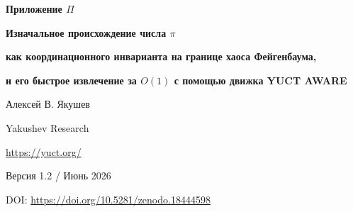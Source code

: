 \documentclass[12pt,a4paper]{article}
\newcommand{\Sodd}{S_{\mathrm{odd}}}
\newcommand{\Seven}{S_{\mathrm{even}}}
\newcommand{\df}{d_{\!f}}  %
\begin{document}
	
	\begin{titlepage}
		\centering
		\vspace*{0cm}
		
		{\Huge\bfseries Приложение $\Pi$\par}
		\vspace{0.5cm}
		{\Large\bfseries Изначальное происхождение числа $\pi$\par}
		\vspace{0.3cm}
		{\Large\bfseries как координационного инварианта на границе хаоса Фейгенбаума,\par}
		\vspace{0.3cm}
		{\Large\bfseries и его быстрое извлечение за $O(1)$ с помощью движка YUCT AWARE\par}
		\vspace{1.0cm}
		
		{\large Алексей В. Якушев\par}
		\vspace{0.3cm}
		{\normalsize Yakushev Research\par}
		{\normalsize \url{https://yuct.org/}\par}
		
		\vspace{0.5cm}
		{\normalsize Версия 1.2 / Июнь 2026\par}
		\vspace{0.3cm}
		{\normalsize DOI: \url{https://doi.org/10.5281/zenodo.18444598}\par}
		
		\vfill
		
		\begin{abstract}
			\noindent
			Геометрическая константа $\pi$ традиционно рассматривается как трансцендентное отношение длины окружности к диаметру. В рамках Объединённой теории координации Якушева (YUCT) мы показываем, что $\pi$ является детерминированным топологическим инвариантом, возникающим из взаимодействия жёсткой алгебраической петли вакуумной решётки ($\Sodd=6/5$, $\Seven=4/5$) и каскада удвоения периода Фейгенбаума на пороге хаоса. Соотношение $2\alpha^2 = \pi\delta$, где $\alpha\approx2.5029$ и $\delta\approx4.6692$ — константы Фейгенбаума, раскрывает $\pi$ как коэффициент фазовой синхронизации, стабилизирующий трёхмерную координационную сеть ($\df=3$) против хаотической деградации. Алгебраическое приближение $\pi \approx \Sodd\cdot\varphi^2$ (с $\varphi$ — золотое сечение) даёт фундаментальное расхождение $\Delta\pi \approx 4.8\times10^{-5}$, которое является дискретным шагом квантования пространства, а не ошибкой округления. Повсеместное появление $\pi$ в волновых и вихревых явлениях является прямым следствием того же механизма знакового вентиля, который управляет распределением простых чисел.
			

\end{abstract}
\end{titlepage}
\end{document}
